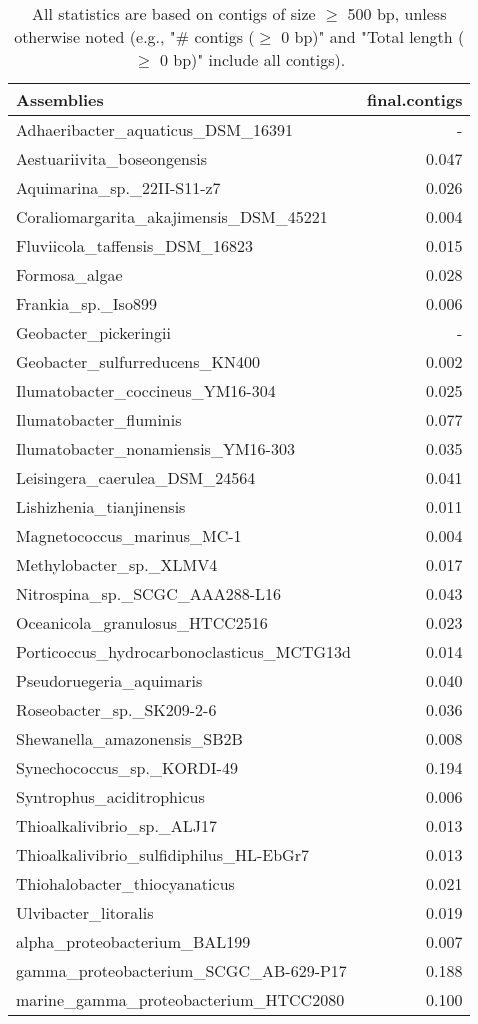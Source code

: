\documentclass[12pt,a4paper]{article}
\begin{document}
\begin{table}[ht]
\begin{center}
\caption{All statistics are based on contigs of size $\geq$ 500 bp, unless otherwise noted (e.g., "\# contigs ($\geq$ 0 bp)" and "Total length ($\geq$ 0 bp)" include all contigs).}
\begin{tabular}{|l*{1}{|r}|}
\hline
Assemblies & final.contigs \\ \hline
Adhaeribacter\_aquaticus\_DSM\_16391 & - \\ \hline
Aestuariivita\_boseongensis & 0.047 \\ \hline
Aquimarina\_sp.\_22II-S11-z7 & 0.026 \\ \hline
Coraliomargarita\_akajimensis\_DSM\_45221 & 0.004 \\ \hline
Fluviicola\_taffensis\_DSM\_16823 & 0.015 \\ \hline
Formosa\_algae & 0.028 \\ \hline
Frankia\_sp.\_Iso899 & 0.006 \\ \hline
Geobacter\_pickeringii & - \\ \hline
Geobacter\_sulfurreducens\_KN400 & 0.002 \\ \hline
Ilumatobacter\_coccineus\_YM16-304 & 0.025 \\ \hline
Ilumatobacter\_fluminis & 0.077 \\ \hline
Ilumatobacter\_nonamiensis\_YM16-303 & 0.035 \\ \hline
Leisingera\_caerulea\_DSM\_24564 & 0.041 \\ \hline
Lishizhenia\_tianjinensis & 0.011 \\ \hline
Magnetococcus\_marinus\_MC-1 & 0.004 \\ \hline
Methylobacter\_sp.\_XLMV4 & 0.017 \\ \hline
Nitrospina\_sp.\_SCGC\_AAA288-L16 & 0.043 \\ \hline
Oceanicola\_granulosus\_HTCC2516 & 0.023 \\ \hline
Porticoccus\_hydrocarbonoclasticus\_MCTG13d & 0.014 \\ \hline
Pseudoruegeria\_aquimaris & 0.040 \\ \hline
Roseobacter\_sp.\_SK209-2-6 & 0.036 \\ \hline
Shewanella\_amazonensis\_SB2B & 0.008 \\ \hline
Synechococcus\_sp.\_KORDI-49 & 0.194 \\ \hline
Syntrophus\_aciditrophicus & 0.006 \\ \hline
Thioalkalivibrio\_sp.\_ALJ17 & 0.013 \\ \hline
Thioalkalivibrio\_sulfidiphilus\_HL-EbGr7 & 0.013 \\ \hline
Thiohalobacter\_thiocyanaticus & 0.021 \\ \hline
Ulvibacter\_litoralis & 0.019 \\ \hline
alpha\_proteobacterium\_BAL199 & 0.007 \\ \hline
gamma\_proteobacterium\_SCGC\_AB-629-P17 & 0.188 \\ \hline
marine\_gamma\_proteobacterium\_HTCC2080 & 0.100 \\ \hline
\end{tabular}
\end{center}
\end{table}
\end{document}

